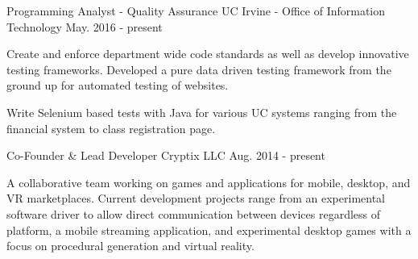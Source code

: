 

\begin{cventries}

  \cventry
    {Programming Analyst - Quality Assurance} %
    {UC Irvine - Office of Information Technology} %
    {} %
    {May. 2016 - present} %
    {
      \begin{cvitems} %
        \item {Create and enforce department wide code standards as well as %
        develop innovative testing frameworks. Developed a pure data driven %
        testing framework from the ground up for automated testing of websites.}
        \item {Write Selenium based tests with Java for various UC systems %
        ranging from the financial system to class registration page.}
      \end{cvitems}
    }

  \cventry
    {Co-Founder \& Lead Developer} %
    {Cryptix LLC} %
    {} %
    {Aug. 2014 - present} %
    {
      \begin{cvitems} %
        \item {A collaborative team working on games and applications for %
        mobile, desktop, and VR marketplaces. Current development projects range %
        from an experimental software driver to allow direct communication %
        between devices regardless of platform, a mobile streaming application, %
        and experimental desktop games with a focus on procedural generation and %
        virtual reality.}
      \end{cvitems}
    }


\end{cventries}
